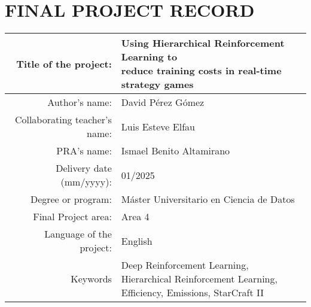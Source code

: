 \chapter*{FINAL PROJECT RECORD}

\begin{table}[ht]
\centering{}
\renewcommand{\arraystretch}{2}
\begin{tabular}{r | l}
\hline
Title of the project: & \makecell[cl]{Using Hierarchical Reinforcement Learning to\\reduce training costs in real-time strategy games}\\
\hline
Author's name: & David Pérez Gómez\\
\hline
Collaborating teacher's name: & Luis Esteve Elfau\\
\hline
PRA's name: & Ismael Benito Altamirano\\
\hline
Delivery date (mm/yyyy): & 01/2025\\
\hline
Degree or program: & Máster Universitario en Ciencia de Datos\\
\hline
Final Project area: & Area 4\\
\hline
Language of the project: & English\\
\hline
Keywords & \makecell[cl]{Deep Reinforcement Learning,\\ Hierarchical Reinforcement Learning,\\ Efficiency, Emissions, StarCraft II\\}\\
\hline
\end{tabular}
\end{table}
